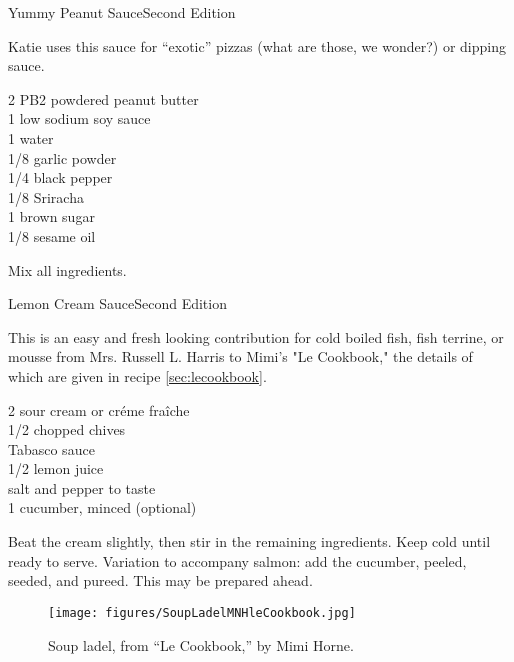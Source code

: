 \begin{entry}{Yummy Peanut Sauce}{Second Edition}

\begin{open}
 Katie uses this sauce for ``exotic'' pizzas (what are those, we wonder?) or dipping sauce. 
\end{open}
\begin{ingredients}
  \SI{2}{\tblspoon} PB2 powdered peanut butter \\
  \SI{1}{\teaspoon} low sodium soy sauce \\
  \SI{1}{\tblspoon} water \\
  \SI{1/8}{\teaspoon} garlic powder \\ 
 \SI{1/4}{\teaspoon} black pepper \\  
  \SI{1/8}{\teaspoon} Sriracha \\ 
 \SI{1}{\tblspoon} brown sugar \\
   \SI{1/8}{\teaspoon} sesame oil 
\end{ingredients}

Mix all ingredients.

\end{entry}

\begin{entry}{Lemon Cream Sauce}{Second Edition}

\begin{open}
 This is an easy and fresh looking contribution for cold boiled fish, fish terrine, or mousse from Mrs. Russell L. Harris to Mimi's "Le Cookbook," the details of which are given in recipe \ref{sec:lecookbook}. 
\end{open}
\begin{ingredients}
   \SI{2}{\cup} sour cream or cr\'eme fra\^iche \\
  \SI{1/2}{\cup} chopped chives \\
  Tabasco sauce \\
  \SI{1/2}{\cup} lemon juice \\
  salt and pepper to taste \\
 \SI{1}{\cup} cucumber, minced (optional) 
 
\end{ingredients}

Beat the cream slightly, then stir in the remaining ingredients. Keep cold until ready to serve. Variation to accompany salmon: add the cucumber, peeled, seeded, and pureed. This may be prepared ahead.

\begin{figure}
    \centering
    \texttt{[image: figures/SoupLadelMNHleCookbook.jpg]}
    \caption{Soup ladel, from ``Le Cookbook,'' by Mimi Horne.}
    \label{fig:mimi_ladel}
\end{figure}
\end{entry}

